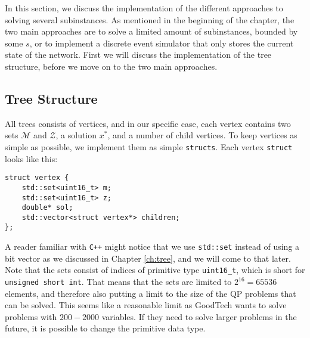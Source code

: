 In this section, we discuss the implementation of the different approaches to
solving several subinstances.
As mentioned in the beginning of the chapter, the two
main approaches are to solve a limited amount of subinstances, bounded
by some $s$, or to implement a discrete event simulator that only stores
the current state of the network. First we will discuss the implementation
of the tree structure, before we move on to the two main approaches.

\subsection{Tree Structure}
All trees consists of vertices, and in our specific case, each vertex contains
two sets $\mathcal{M}$ and $\mathcal{Z}$, a solution $x^*$, and a number of
child vertices. To keep vertices as simple as possible, we implement them as
simple \texttt{structs}. Each vertex \texttt{struct} looks like
this:
\begin{verbatim}
struct vertex {
    std::set<uint16_t> m;
    std::set<uint16_t> z;
    double* sol;
    std::vector<struct vertex*> children;
};
\end{verbatim}
A reader familiar with \texttt{C++} might notice that we use
\texttt{std::set} instead of using a bit vector as we discussed
in Chapter \ref{ch:tree}, and we will come to that later. Note that
the sets consist of indices of primitive type \texttt{uint16\_t}, which is
short for \texttt{unsigned short int}. That means that the sets are limited to
$2^{16} = 65536$ elements, and therefore also putting a limit to the size
of the QP problems that can be solved. This seems like a reasonable limit
as GoodTech wants to solve problems with $200 - 2000$ variables.
If they need to solve larger problems in the future, it is possible to change
the primitive data type.

